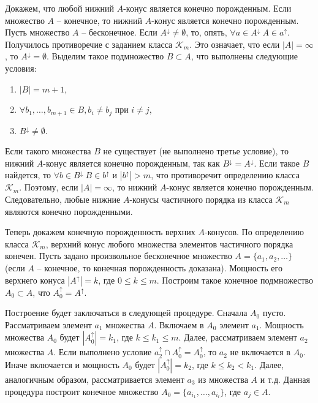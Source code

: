\documentclass[12pt]{article}
\theoremstyle{break}
\def\K{\mathcal{K}_m}
\begin{document}
		Докажем, что любой нижний $A$-конус является конечно порожденным. Если множество $A$ -- конечное, то нижний $A$-конус является конечно порожденным. Пусть множество $A$ -- бесконечное. Если $A^{\downarrow} \neq \emptyset$, то, опять, $\forall a\in A^{\downarrow}~A\in a^{\uparrow}$. Получилось противоречие с заданием класса $\K$. Это означает, что если $|A| = \infty$, то $A^{\downarrow} = \emptyset$. Выделим такое подмножество $B\subset A$, что выполнены следующие условия:
		\begin{enumerate}
			\item $|B| = m + 1$,
			\item $\forall b_1,\dots,b_{m+1}\in B, b_i\neq b_j$ при $i\neq j$,
			\item $B^{\downarrow} \neq \emptyset$.
		\end{enumerate}
		Если такого множества $B$ не существует (не выполнено третье условие), то нижний $A$-конус является конечно порожденным, так как $B^{\downarrow} = A^{\downarrow}$. Если такое $B$ найдется, то $\forall b\in B^{\downarrow}~B\in b^{\uparrow}$ и $|b^{\uparrow}| > m$, что противоречит определению класса $\K$. Поэтому, если $|A|=\infty$, то нижний $A$-конус является конечно порожденным. Следовательно, любые нижние $A$-конусы частичного порядка из класса $\K$ являются конечно порожденными.

		Теперь докажем конечную порожденность верхних $A$-конусов. По определению класса $\K$, верхний конус любого множества элементов частичного порядка конечен. Пусть задано произвольное бесконечное множество $A = \{a_1, a_2,\dots\}$ (если $A$ -- конечное, то конечная порожденность доказана). Мощность его верхнего конуса $|A^{\uparrow}| = k$, где $0\leqslant k\leqslant m$. Построим такое конечное подмножество $A_0\subset A$, что $A_0^{\uparrow} = A^{\uparrow}$.

		Построение будет заключаться в следующей процедуре. Сначала $A_0$ пусто. Рассматриваем элемент $a_1$ множества $A$. Включаем в $A_0$ элемент $a_1$. Мощность множества $A_0$ будет $|A_0^{\uparrow}| = k_1$, где $k\leqslant k_1\leqslant m$. Далее, рассматриваем элемент $a_2$ множества $A$. Если выполнено условие $a_2^{\uparrow} \cap A_0^{\uparrow} = A_0^{\uparrow}$, то $a_2$ не включается в $A_0$. Иначе включается и мощность $A_0$ будет $|A_0^{\uparrow}| = k_2$, где $k\leqslant k_2 < k_1$. Далее, аналогичным образом, рассматривается элемент $a_3$ из множества $A$ и т.д. Данная процедура построит конечное множество $A_0=\{a_{i_1},\dots, a_{i_l}\}$, где $a_j\in A$.
\end{document}
